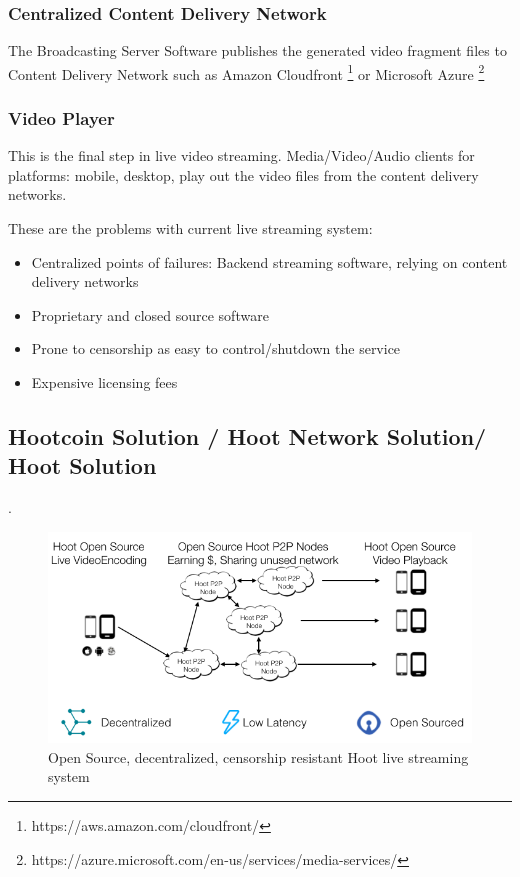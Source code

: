 \documentclass{article}
\begin{document}
\subsubsection{Centralized Content Delivery Network}
The Broadcasting Server Software publishes the generated video fragment files to Content Delivery Network such as Amazon Cloudfront \footnote{https://aws.amazon.com/cloudfront/} or Microsoft Azure \footnote{https://azure.microsoft.com/en-us/services/media-services/}

\subsubsection{Video Player}
This is the final step in live video streaming. Media/Video/Audio clients for platforms: mobile, desktop, play out the video files from the content delivery networks.


These are the problems with current live streaming system:
\begin{itemize}
  \item{Centralized points of failures: Backend streaming software, relying on content delivery networks}
  \item{Proprietary and closed source software}
  \item{Prone to censorship as easy to control/shutdown the service}
  \item{Expensive licensing fees}
\end{itemize}

\subsection{Hootcoin Solution / Hoot Network Solution/ Hoot Solution}
 .

\begin{figure}[h!]
  \centering
  \includegraphics[width=1.0\textwidth]{static/hoot-solution}
  \caption{Open Source, decentralized, censorship resistant Hoot live streaming system}
  \label{image:hoot-solution}
\end{figure}
\end{document}
